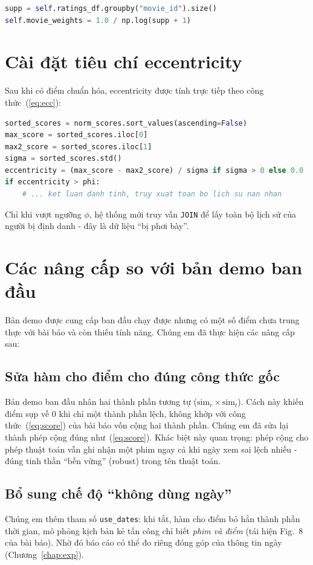 \begin{lstlisting}[language=Python]
supp = self.ratings_df.groupby("movie_id").size()
self.movie_weights = 1.0 / np.log(supp + 1)
\end{lstlisting}

\section{Cài đặt tiêu chí eccentricity}

Sau khi có điểm chuẩn hóa, eccentricity được tính trực tiếp theo công thức~(\ref{eq:ecc}):

\begin{lstlisting}[language=Python]
sorted_scores = norm_scores.sort_values(ascending=False)
max_score = sorted_scores.iloc[0]
max2_score = sorted_scores.iloc[1]
sigma = sorted_scores.std()
eccentricity = (max_score - max2_score) / sigma if sigma > 0 else 0.0
if eccentricity > phi:
    # ... ket luan danh tinh, truy xuat toan bo lich su nan nhan
\end{lstlisting}

Chỉ khi vượt ngưỡng $\phi$, hệ thống mới truy vấn \texttt{JOIN} để lấy toàn bộ lịch sử của người bị định danh - đây là dữ liệu ``bị phơi bày''.

\section{Các nâng cấp so với bản demo ban đầu}

Bản demo được cung cấp ban đầu chạy được nhưng có một số điểm chưa trung thực với bài báo và còn thiếu tính năng. Chúng em đã thực hiện các nâng cấp sau:

\subsection{Sửa hàm cho điểm cho đúng công thức gốc}
Bản demo ban đầu nhân hai thành phần tương tự ($\mathrm{sim}_r \times \mathrm{sim}_t$). Cách này khiến điểm sụp về 0 khi chỉ một thành phần lệch, không khớp với công thức~(\ref{eq:score}) của bài báo vốn cộng hai thành phần. Chúng em đã sửa lại thành phép cộng đúng như~(\ref{eq:score}). Khác biệt này quan trọng: phép cộng cho phép thuật toán vẫn ghi nhận một phim ngay cả khi ngày xem sai lệch nhiều - đúng tinh thần ``bền vững'' (robust) trong tên thuật toán.

\subsection{Bổ sung chế độ ``không dùng ngày''}
Chúng em thêm tham số \texttt{use\_dates}: khi tắt, hàm cho điểm bỏ hẳn thành phần thời gian, mô phỏng kịch bản kẻ tấn công chỉ biết \textit{phim và điểm} (tái hiện Fig.~8 của bài báo). Nhờ đó báo cáo có thể đo riêng đóng góp của thông tin ngày (Chương~\ref{chap:exp}).

